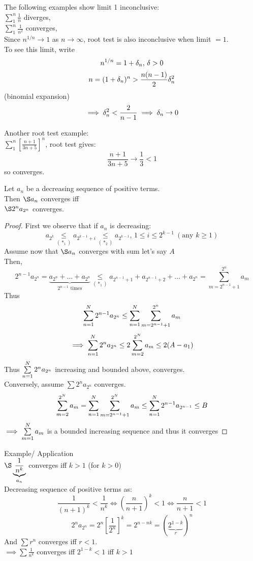 \begin{normal}
The following examples show limit 1 inconclusive:\\
$\sum\limits_1^n \frac{1}{n}$ diverges,\\
$\sum\limits_1^n \frac{1}{n^2}$ converges,\\
Since $n^{1/n} \to 1$ as $n \to \infty$, root test is also inconclusive when limit $= 1$.\\
To see this limit, write
\[n^{1/n} = 1 + \de_n,\, \de > 0\]
\[n = (1 + \de_n)^n > \frac{n(n-1)}{2}\de_n^2\]
(binomial expansion)
\[\implies \de_n^2 < \frac{2}{n-1} \implies \de_n \to 0\]
\end{normal}
\begin{normal}
Another root test example:\\
$\sum\limits_1^n \left [ \frac{n+1}{3n+5} \right ]^n$, root test gives:
\[\frac{n+1}{3n+5} \to \frac{1}{3} < 1\]
so converges.
\end{normal}
\begin{theorem}
Let $a_n$ be a decreasing sequence of positive terms.\\
Then $\S a_n$ converges iff\\
$\S 2^n a_{2^n}$ converges.
\begin{proof}
First we observe that if $a_n$ is decreasing:
\[a_{2^k} \underset{(*_1)}{\leq} a_{2^{k-1} + i} \underset{(*_2)}{\leq} a_{2^{k-1}},\, 1 \leq i \leq 2^{k-1} \ (\text{any } k \geq 1)\]
Assume now that $\S a_n$ converges with sum let's say $A$\\
Then,\\
\[2^{n-1} a_{2^n} = \underbrace{a_{2^n} + \dots + a_{2^n}}_{2^{n-1} \text{ times}} \underset{(*_1)}{\leq} a_{2^{n-1} + 1} + a_{2^{n-1} + 2} + \dots + a_{2^n} = \sum\limits_{m=2^{n-1} + 1}^{2^n} a_m\]
Thus
\[\s[n]{N} 2^{n-1} a_{2^n} \leq \s[n]{N} \sum\limits_{m=2^{n-1} + 1}^{2^n} a_m\]
\[\implies \s[n]{N} 2^n a_{2^n} \leq 2\sum_{m=2}^{2^N} a_m \leq 2(A-a_1)\]
Thus $\s[n]{N} 2^n a_{2^n}$ increasing and bounded above, converges.\\
Conversely, assume $\sum 2^n a_{2^n}$ converges.
\[\sum_{m=2}^{2^N} a_m = \s[n]{N} \sum_{m=2^{n-1} + 1}^{2^N} a_m \leq \s[n]{N} 2^{n-1} a_{2^{n-1}} \leq B\]
$\implies \s[m]{N} a_m$ is a bounded increasing sequence and thus it converges
\end{proof}
\end{theorem}
\begin{normal}
Example/ Application\\
$\S \underbrace{\frac{1}{n^k}}_{a_n}$ converges iff $k > 1$ (for $k > 0$)\\
Decreasing sequence of positive terms as:
\[\frac{1}{(n+1)^k} < \frac{1}{n^k} \iff \left ( \frac{n}{n+1} \right )^k < 1 \iff \frac{n}{n+1} < 1\]
\[2^n a_{2^n} = 2^n \left[ \frac{1}{2^n}\right]^k = 2^{n-nk} = ( \underbrace{2^{1-k}}_r )^n\]
And $\sum r^n$ converges iff $r < 1$.\\
$\implies \sum \frac{1}{n^k}$ converges iff $2^{1-k} < 1$ iff $k > 1$
\end{normal}
